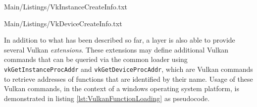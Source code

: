     
    {Main/Listings/VkInstanceCreateInfo.txt}

    
    {Main/Listings/VkDeviceCreateInfo.txt}

    In addition to what has been described so far, a layer is also able to provide several Vulkan \textit{extensions}.
    These extensions may define additional Vulkan commands that can be queried via the common loader using \lstinline{vkGetInstanceProcAddr} and \lstinline{vkGetDeviceProcAddr}, which are Vulkan commands to retrieve addresses of functions that are identified by their name.
    Usage of these Vulkan commands, in the context of a \gls{windows} operating system platform, is demonstrated in listing \ref{lst:VulkanFunctionLoading} as pseudocode.

